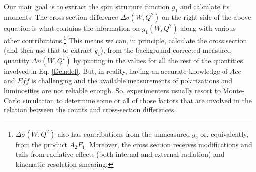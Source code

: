 Our main goal is to extract the spin structure function $g_1$ and calculate its moments. 
The cross section difference $\Delta \sigma (W,Q^2) $ on the right side of the above equation is what contains the information on 
$g_1(W,Q^2)$ along with various other contributions.\footnote{$\Delta \sigma (W,Q^2) $ also has contributions from the unmeasured 
$g_2$ or, equivalently, from the product $A_2F_1$. Moreover, the cross section receives modifications and tails from radiative effects (both internal and external radiation) and kinematic resolution smearing.} This means we can, in principle, calculate the cross section (and then use that to extract $g_1$), from the background corrected measured quantity $\Delta n (W,Q^2)$ by putting in the values for all the rest of the quantities involved in Eq. \ref{Delndef}. But, in reality, having an accurate knowledge of $Acc$ and $Eff$ is challenging and %
the available measurements of polarizations and luminosities are not reliable enough. So, experimenters usually resort to Monte-Carlo simulation to determine some or all of those factors that are involved in the relation between the counts and cross-section differences.

